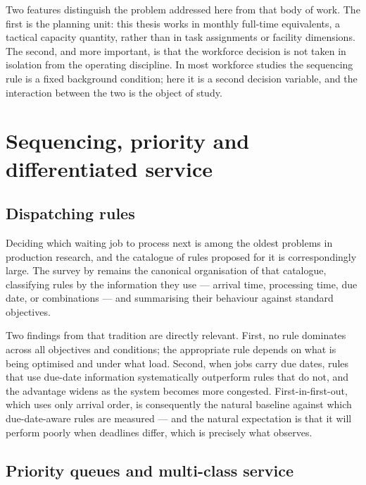 Two features distinguish the problem addressed here from that body of work. The first is the
planning unit: this thesis works in monthly full-time equivalents, a tactical capacity quantity,
rather than in task assignments or facility dimensions. The second, and more important, is that
the workforce decision is not taken in isolation from the operating discipline. In most
workforce studies the sequencing rule is a fixed background condition; here it is a second
decision variable, and the interaction between the two is the object of study.

\section{Sequencing, priority and differentiated service}
\label{sec:lit-sequencing}

\subsection{Dispatching rules}

Deciding which waiting job to process next is among the oldest problems in production research,
and the catalogue of rules proposed for it is correspondingly large. The survey by
\citet{panwalkar1977} remains the canonical organisation of that catalogue, classifying rules by
the information they use --- arrival time, processing time, due date, or combinations --- and
summarising their behaviour against standard objectives.

Two findings from that tradition are directly relevant. First, no rule dominates across all
objectives and conditions; the appropriate rule depends on what is being optimised and under
what load. Second, when jobs carry due dates, rules that use due-date information systematically
outperform rules that do not, and the advantage widens as the system becomes more congested.
First-in-first-out, which uses only arrival order, is consequently the natural baseline against
which due-date-aware rules are measured --- and the natural expectation is that it will perform
poorly when deadlines differ, which is precisely what  observes.

\subsection{Priority queues and multi-class service}

